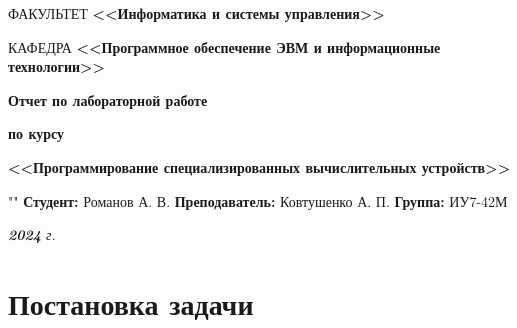 \documentclass[12pt, a4paper]{article}
\begin{document}
\begin{titlepage}
	\begin{flushleft}
		\fontsize{12pt}{0.8\baselineskip}\selectfont 
		
		ФАКУЛЬТЕТ \textbf{<<\textbf{Информатика и системы управления}>> \hfill}
		
		КАФЕДРА \textbf{\mbox{\hspace{4mm}} <<\textbf{Программное обеспечение ЭВМ и информационные технологии}>> \hfill}
	\end{flushleft}
	
	\vfill
	
	\begin{center}
		\fontsize{20pt}{\baselineskip}\selectfont
		
		\textbf{{Отчет по лабораторной работе}}
		
		\textbf{{по курсу}}
		
		\textbf{<<Программирование специализированных вычислительных устройств>>}
	\end{center}
	
		\fontsize{18pt}{0.6cm}\selectfont 
		""\newline\newline\newline\newline\newline\newline\newline
		\textbf{Студент:} Романов А. В.\newline
		\textbf{Преподаватель:} Ковтушенко А. П.\newline
		\textbf{Группа:} ИУ7-42М\newline
	
	\vfill
	
	\begin{table}[h!]
		\fontsize{12pt}{0.7\baselineskip}\selectfont

		
		\vspace{\baselineskip}
		
	\end{table}
	
	\vfill
	
	\begin{center}
		\normalsize \textit{\textbf{2024} г.}
	\end{center}
\end{titlepage}
	
\section{Постановка задачи}
\end{document}
